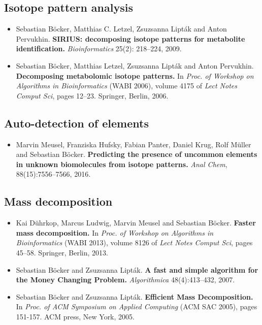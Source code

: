 \documentclass[letterpaper,10pt,openany,oneside]{sphinxmanual}
\begin{document}
\subsection{Isotope pattern analysis}
\label{introduction:isotope-pattern-analysis}

\begin{itemize}
\item Sebastian Böcker, Matthias C. Letzel, Zsuzsanna Lipták and Anton
Pervukhin.
\textbf{SIRIUS: decomposing isotope patterns for metabolite identification.}
\emph{Bioinformatics} 25(2): 218--224, 2009.

\item Sebastian Böcker, Matthias Letzel, Zsuzsanna Lipták and Anton Pervukhin.
\textbf{Decomposing metabolomic isotope patterns.}
In \emph{Proc. of Workshop on Algorithms in Bioinformatics} (WABI 2006), volume 4175 of \emph{Lect Notes Comput Sci}, pages 12--23. Springer, Berlin, 2006. 
\end{itemize}


\subsection{Auto-detection of elements}
\label{introduction:auto-detection-of-elements}

\begin{itemize}
\item Marvin Meusel, Franziska Hufsky, Fabian Panter, Daniel Krug, Rolf Müller and Sebastian Böcker.
\textbf{Predicting the presence of uncommon elements in unknown biomolecules from isotope patterns.}
\emph{Anal Chem}, 88(15):7556--7566, 2016. 
\end{itemize}

\subsection{Mass decomposition}
\label{introduction:mass-decomposition}

\begin{itemize}
\item Kai Dührkop, Marcus Ludwig, Marvin Meusel and Sebastian Böcker.
\textbf{Faster mass decomposition.}
In \emph{Proc. of Workshop on Algorithms in Bioinformatics} (WABI 2013), volume 8126 of \emph{Lect Notes Comput Sci}, pages 45--58. Springer, Berlin, 2013.

\item Sebastian Böcker and Zsuzsanna Lipták.
\textbf{A fast and simple algorithm for the Money Changing Problem.}
\emph{Algorithmica} 48(4):413--432, 2007.

\item Sebastian Böcker and Zsuzsanna Lipták.
\textbf{Efficient Mass Decomposition.}
In \emph{Proc. of ACM Symposium on Applied Computing} (ACM SAC 2005), pages 151-157. ACM press, New York, 2005. 
\end{itemize}
\end{document}
